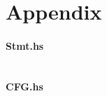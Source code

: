 \documentclass[a4paper]{article}
\begin{document}
\newpage
\section{Appendix}
\paragraph{Stmt.hs}
\inputminted{haskell}{../src/Stmt.hs}
\newpage
\paragraph{CFG.hs}
\inputminted{haskell}{../src/CFG.hs}

\newpage
{}

\end{document}
